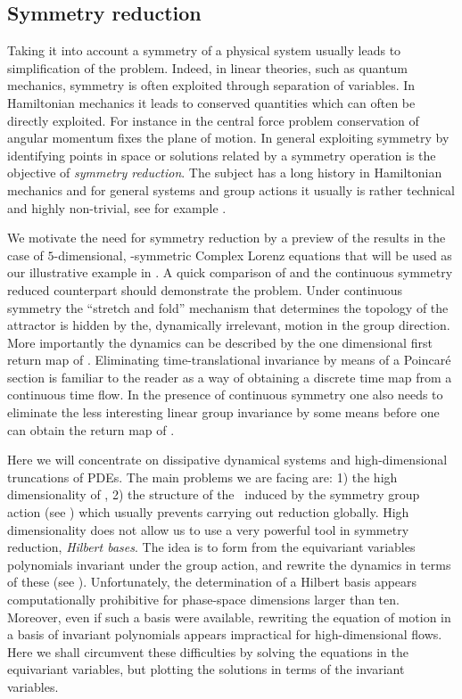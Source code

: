\subsection{Symmetry reduction}

Taking it into account  a symmetry of a physical system
usually leads to simplification of the problem.
Indeed, in linear theories, such as quantum mechanics, symmetry is often exploited
through separation of variables. In Hamiltonian mechanics it leads to conserved quantities which can often be
directly exploited. For instance in the central force problem conservation of angular momentum fixes the plane
of motion.
In general exploiting symmetry by identifying points in space or solutions
related by a symmetry operation is the objective of
\emph{symmetry reduction}. The subject has a long history in Hamiltonian mechanics and for general systems
and group actions it usually is rather technical and highly non-trivial, see for example
.

We motivate the need for symmetry reduction by a preview of the results in the case of $5$-dimensional,
-symmetric Complex Lorenz equations that will be used as our illustrative example in .
 A quick comparison of
 and the continuous symmetry reduced  counterpart should demonstrate the problem.
Under continuous symmetry the ``stretch and fold'' mechanism that determines the topology of the attractor
is hidden by the, dynamically irrelevant, motion in the group direction. More importantly the dynamics can
be described by the one dimensional first return map of . Eliminating time-translational
invariance by means of a Poincar\'e section is familiar to the reader as a way of obtaining a discrete time map from
a continuous time flow. In the presence of continuous symmetry one also needs to eliminate the less interesting
linear group invariance by some means before one can obtain the return map of .

Here we will concentrate on dissipative dynamical systems and high-dimensional truncations
of PDEs. The main problems we are facing are: 1) the high dimensionality of \statesp, 2) the structure of
the \statesp\ induced by the symmetry group action (see )
which usually prevents carrying out reduction globally.
High dimensionality does not allow us to use a very powerful
tool in symmetry reduction, \emph{Hilbert bases}.
The idea is to form from the equivariant variables 
polynomials invariant under the group action, and rewrite the
dynamics in terms of these (see ).
Unfortunately, the determination of a Hilbert basis appears
computationally prohibitive for phase-space dimensions
larger than ten. Moreover, even
if such a basis were available, rewriting the equation of
motion in a basis of invariant polynomials appears
impractical for high-dimensional flows.
Here we shall circumvent these difficulties by solving the
equations in the equivariant variables, but plotting the
solutions in terms of the invariant variables.


